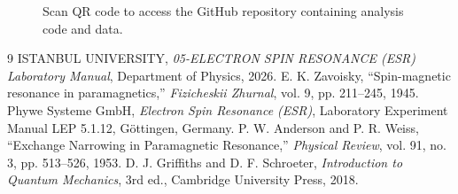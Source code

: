 \documentclass[journal]{IEEEtran}
\begin{document}
\begin{figure}[H]
    \centering
    \begin{minipage}{0.15\textwidth}
        \centering
    \end{minipage}%
    \begin{minipage}{0.2\textwidth}
        \raggedright
        \caption{Scan QR code to access the GitHub repository containing analysis code and data.}
        \label{fig:qr_code}
    \end{minipage}
\end{figure}

\begin{thebibliography}{9}
    ISTANBUL UNIVERSITY, \textit{05-ELECTRON SPIN RESONANCE (ESR) Laboratory Manual}, Department of Physics, 2026.
    E. K. Zavoisky, ``Spin-magnetic resonance in paramagnetics,'' \textit{Fizicheskii Zhurnal}, vol. 9, pp. 211--245, 1945.
    Phywe Systeme GmbH, \textit{Electron Spin Resonance (ESR)}, Laboratory Experiment Manual LEP 5.1.12, G\"ottingen, Germany.
    P. W. Anderson and P. R. Weiss, ``Exchange Narrowing in Paramagnetic Resonance,'' \textit{Physical Review}, vol. 91, no. 3, pp. 513--526, 1953.
    D. J. Griffiths and D. F. Schroeter, \textit{Introduction to Quantum Mechanics}, 3rd ed., Cambridge University Press, 2018.
\end{thebibliography}
\end{document}
